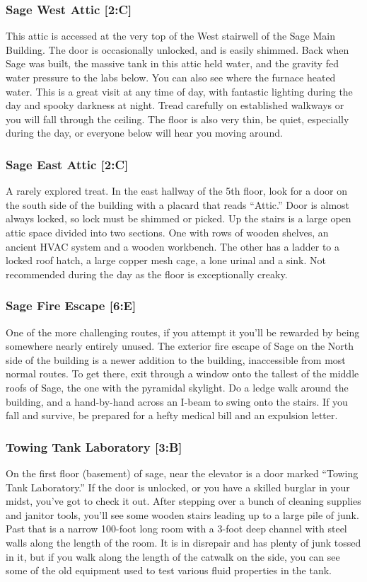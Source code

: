 \documentclass{article}
\begin{document}
\subsubsection{Sage West Attic [2:C]}
This attic is accessed at the very top of the West stairwell of the Sage Main Building. The door is occasionally unlocked, and is easily shimmed. Back when Sage was built, the massive tank in this attic held water, and the gravity fed water pressure to the labs below. You can also see where the furnace heated water. This is a great visit at any time of day, with fantastic lighting during the day and spooky darkness at night. Tread carefully on established walkways or you will fall through the ceiling. The floor is also very thin, be quiet, especially during the day, or everyone below will hear you moving around.
\subsubsection{Sage East Attic [2:C]}
A rarely explored treat. In the east hallway of the 5th floor, look for a door on the south side of the building with a placard that reads “Attic.” Door is almost always locked, so lock must be shimmed or picked. Up the stairs is a large open attic space divided into two sections. One with rows of wooden shelves, an ancient HVAC system and a wooden workbench. The other has a ladder to a locked roof hatch, a large copper mesh cage, a lone urinal and a sink. Not recommended during the day as the floor is exceptionally creaky.

 \subsubsection{Sage Fire Escape [6:E]}
One of the more challenging routes, if you attempt it you’ll be rewarded by being somewhere nearly entirely unused. The exterior fire escape of Sage on the North side of the building is a newer addition to the building, inaccessible from most normal routes. To get there, exit through a window onto the tallest of the middle roofs of Sage, the one with the pyramidal skylight. Do a ledge walk around the building, and a hand-by-hand across an I-beam to swing onto the stairs. If you fall and survive, be prepared for a hefty medical bill and an expulsion letter.
\subsubsection{Towing Tank Laboratory [3:B]}
On the first floor (basement) of sage, near the elevator is a door marked “Towing Tank Laboratory.” If the door is unlocked, or you have a skilled burglar in your midst, you’ve got to check it out. After stepping over a bunch of cleaning supplies and janitor tools, you’ll see some wooden stairs leading up to a large pile of junk. Past that is a narrow 100-foot long room with a 3-foot deep channel with steel walls along the length of the room. It is in disrepair and has plenty of junk tossed in it, but if you walk along the length of the catwalk on the side, you can see some of the old equipment used to test various fluid properties in the tank.
\end{document}
